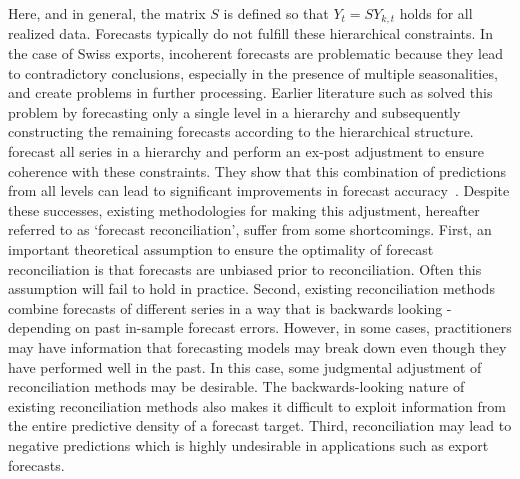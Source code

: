 \documentclass[a4paper,fleqn,11pt]{article}
\begin{document}
Here, and in general, the matrix $S$ is defined so that $Y_t = S Y_{k,t}$ holds for all realized data. Forecasts typically do not fulfill these hierarchical constraints. In the case of Swiss exports, incoherent forecasts are problematic because they lead to contradictory conclusions, especially in the presence of multiple seasonalities, and create problems in further processing. Earlier literature such as \cite{Gross1990} solved this problem by forecasting only a single level in a hierarchy and subsequently constructing the remaining forecasts according to the hierarchical structure. \cite{Hyndman2011} forecast all series in a hierarchy and perform an ex-post adjustment to ensure coherence with these constraints. They show that this combination of predictions from all levels can lead to significant improvements in forecast accuracy~\citep[see][and references therein]{Wickramasuriya2015}. Despite these successes, existing methodologies for making this adjustment, hereafter referred to as `forecast reconciliation', suffer from some shortcomings.  First, an important theoretical assumption to ensure the optimality of forecast reconciliation is that forecasts are unbiased prior to reconciliation.  Often this assumption will fail to hold in practice.  Second, existing reconciliation methods combine forecasts of different series in a way that is backwards looking - depending on past in-sample forecast errors.  However, in some cases, practitioners may have information that forecasting models may break down even though they have performed well in the past. In this case, some judgmental adjustment of reconciliation methods may be desirable.  The backwards-looking nature of existing reconciliation methods also makes it difficult to exploit information from the entire predictive density of a forecast target. Third, reconciliation may lead to negative predictions which is highly undesirable in applications such as export forecasts.\\
\end{document}
